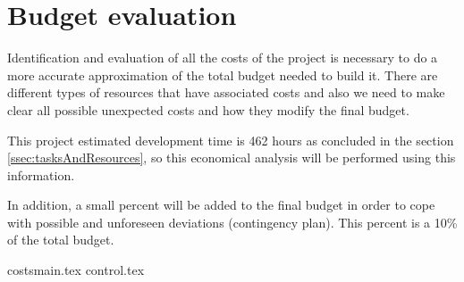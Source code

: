 \section{Budget evaluation}
\label{sec:budget}
Identification and evaluation of all the costs of the project is necessary to do a more accurate approximation of the total budget needed to build it. There are different types of resources that have associated costs and also we need to make clear all possible unexpected costs and how they modify the final budget.

This project estimated development time is 462 hours as concluded in the section \ref{ssec:tasksAndResources}, so this economical analysis will be performed using this information.

In addition, a small percent will be added to the final budget in order to cope with possible and unforeseen deviations (contingency plan). This percent is a 10\% of the total budget.

{costsmain.tex}
{control.tex}